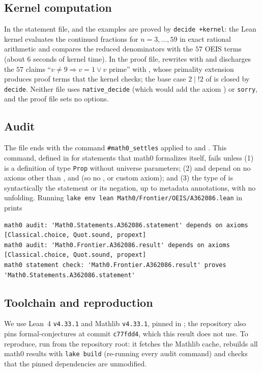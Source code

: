 \documentclass[11pt]{amsart}
\theoremstyle{plain}
\theoremstyle{definition}
\newcommand{\lf}{\mathop{!}}
\begin{document}
\subsection*{Kernel computation}
In the statement file,  and the examples are proved by \texttt{decide +kernel}: the Lean kernel evaluates the continued fractions for $n=3,\dots,59$ in exact rational arithmetic and compares the reduced denominators with the $57$ OEIS terms (about $6$ seconds of kernel time). In the proof file,  rewrites with  and discharges the $57$ claims ``$v\ne9\Rightarrow v=1\lor v$ prime'' with , whose primality extension produces proof terms that the kernel checks; the base case $2\mid\lf2$ of  is closed by \texttt{decide}. Neither file uses \texttt{native\_decide} (which would add the axiom ) or \texttt{sorry}, and the proof file sets no options.

\subsection*{Audit}
The file ends with the command \texttt{\#math0\_settles} applied to  and . This command, defined in  for statements that math0 formalizes itself, fails unless (1)  is a definition of type \texttt{Prop} without universe parameters; (2)  and  depend on no axioms other than ,  and  (so no ,  or custom axiom); and (3) the type of  is syntactically the statement or its negation, up to metadata annotations, with no unfolding. Running \texttt{lake env lean Math0/Frontier/OEIS/A362086.lean} in  prints
\begin{lstlisting}[basicstyle=\ttfamily\scriptsize]
math0 audit: 'Math0.Statements.A362086.statement' depends on axioms [Classical.choice, Quot.sound, propext]
math0 audit: 'Math0.Frontier.A362086.result' depends on axioms [Classical.choice, Quot.sound, propext]
math0 statement check: 'Math0.Frontier.A362086.result' proves 'Math0.Statements.A362086.statement'
\end{lstlisting}

\subsection*{Toolchain and reproduction}
We use Lean~4 \cite{Lean4} \texttt{v4.33.1} and Mathlib \cite{Mathlib} \texttt{v4.33.1}, pinned in ; the repository also pins formal-conjectures \cite{FC} at commit \texttt{c77fdd4}, which this result does not use.
To reproduce, run  from the repository root: it fetches the Mathlib cache, rebuilds all math0 results with \texttt{lake build} (re-running every audit command) and checks that the pinned dependencies are unmodified.
\end{document}
